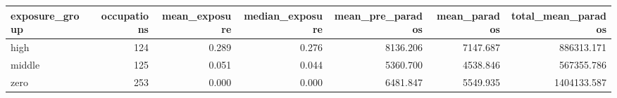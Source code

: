 \begin{tabular}{lrrrrrr}
\toprule
exposure_group & occupations & mean_exposure & median_exposure & mean_pre_parados & mean_parados & total_mean_parados \\
\midrule
high & 124 & 0.289 & 0.276 & 8136.206 & 7147.687 & 886313.171 \\
middle & 125 & 0.051 & 0.044 & 5360.700 & 4538.846 & 567355.786 \\
zero & 253 & 0.000 & 0.000 & 6481.847 & 5549.935 & 1404133.587 \\
\bottomrule
\end{tabular}
